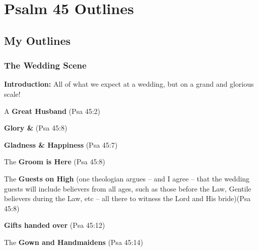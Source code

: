 \section{Psalm 45 Outlines}

\subsection{My Outlines}

\subsubsection{The Wedding Scene}
\textbf{Introduction:} All of what we expect at a wedding, but on a grand and glorious scale! 

\begin{compactenum}[I.][19]
    \item A \textbf{Great Husband} (Psa 45:2)
    \item \textbf{Glory \& } (Psa 45:8)
    \item \textbf{Gladness \& Happiness} (Psa 45:7)
    \item The \textbf{Groom is Here} (Psa 45:8)
    \item The \textbf{Guests on High} (one theologian argues -- and I agree -- that the wedding guests will include believers from all ages, such as those before the Law, Gentile believers during the Law, etc -- all there to witness the Lord and His bride)(Psa 45:8)
    \item \textbf{Gifts handed over} (Psa 45:12)
    \item The \textbf{Gown and Handmaidens} (Psa 45:14)
\end{compactenum}
